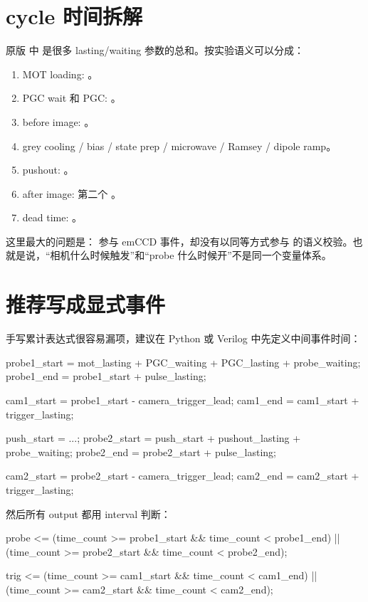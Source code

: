 \documentclass[11pt,oneside,openany]{book}
\begin{document}
\section{cycle 时间拆解}
原版  中  是很多 lasting/waiting 参数的总和。按实验语义可以分成：
\begin{enumerate}
  \item MOT loading: 。
  \item PGC wait 和 PGC: 。
  \item before image: 。
  \item grey cooling / bias / state prep / microwave / Ramsey / dipole ramp。
  \item pushout: 。
  \item after image: 第二个 。
  \item dead time: 。
\end{enumerate}

这里最大的问题是： 参与 emCCD 事件，却没有以同等方式参与  的语义校验。也就是说，“相机什么时候触发”和“probe 什么时候开”不是同一个变量体系。

\section{推荐写成显式事件}
手写累计表达式很容易漏项，建议在 Python 或 Verilog 中先定义中间事件时间：
\begin{codeblock}
probe1_start = mot_lasting + PGC_waiting + PGC_lasting + probe_waiting;
probe1_end   = probe1_start + pulse_lasting;

cam1_start   = probe1_start - camera_trigger_lead;
cam1_end     = cam1_start + trigger_lasting;

push_start   = ...;
probe2_start = push_start + pushout_lasting + probe_waiting;
probe2_end   = probe2_start + pulse_lasting;

cam2_start   = probe2_start - camera_trigger_lead;
cam2_end     = cam2_start + trigger_lasting;
\end{codeblock}

然后所有 output 都用 interval 判断：
\begin{codeblock}
probe <= (time_count >= probe1_start && time_count < probe1_end) ||
         (time_count >= probe2_start && time_count < probe2_end);

trig  <= (time_count >= cam1_start && time_count < cam1_end) ||
         (time_count >= cam2_start && time_count < cam2_end);
\end{codeblock}
\end{document}
